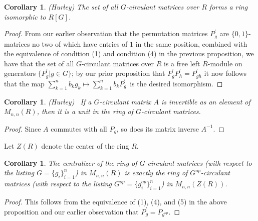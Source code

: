 \documentclass[12pt, a4paper]{amsart}
\numberwithin{equation}{section} %
\theoremstyle{plain}
\theoremstyle{definition}
\theoremstyle{plain}
\newtheorem{cor}[thm]{Corollary}
\theoremstyle{remark}
\begin{document}
\begin{cor}
(Hurley) The set of all $G$-circulant matrices over $R$ forms a ring
isomorphic to $R[G]$.
\end{cor}

\begin{proof}
From our earlier observation that the permutation matrices $P_{g}^{\prime }$
are $\{0,1\}$-matrices no two of which have entries of $1$ in the same
position, combined with the equivalence of condition (1) and condition (4)
in the previous proposition, we have that the set of all $G$-circulant
matrices over $R$ is a free left $R$-module on generators $\{P_{g}^{\prime
}|g\in G\}$; by our prior proposition that $P_{g}^{\prime }P_{h}^{\prime
}=P_{gh}^{\prime }$ it now follows that the map $\sum%
\limits_{k=1}^{n}b_{k}g_{k}\mapsto \sum\limits_{k=1}^{n}b_{k}P_{g\text{ }%
}^{\prime }$is the desired isomorphism.
\end{proof}

\begin{cor}
(Hurley) \ If a $G$-circulant matrix $A$ is invertible as an element of $%
M_{n,n}(R)$, then it is a unit in the ring of $G$-circulant matrices.
\end{cor}

\begin{proof}
Since $A$ commutes with all $P_{g}$, so does its matrix inverse $A^{-1}$.
\end{proof}

Let $Z(R)$ denote the center of the ring $R$.

\begin{cor} The centralizer of the ring of $G$-circulant matrices (with respect to the listing $G=\{g_{i}\}_{i=1}^{n}$) in $M_{n,n}(R)$ is exactly the ring of $G^{op}$-circulant matrices (with respect to the listing $G^{op}=\{g_{i}^{op}\}_{i=1}^{n}$) in $M_{n,n}(Z(R))$. 
\end{cor}
\begin{proof} This follows from the equivalence of (1), (4), and (5) in the above
proposition and our earlier observation that $P_{g}^{\prime }=P_{g^{op}}$.
\end{proof}
\end{document}
